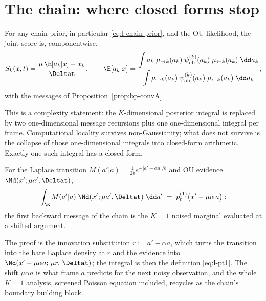 \section{The chain: where closed forms stop}\label{sec:l-chain}

\begin{theorem}\label{thm:l-markov-score}
For any chain prior, in particular \eqref{eq:l-chain-prior}, and the OU
likelihood, the joint score is, componentwise,
\begin{equation}
  S_k(x, t) = \frac{\mu\, \E[a_k | x] - x_k}{\Deltat},
  \qquad
  \E[a_k | x]
  = \frac{\displaystyle\int a_k\; \mu_{\to k}(a_k)\;
      \psi^{(k)}_{\mathrm{ob}}(a_k)\;
      \mu_{\leftarrow k}(a_k)\;\dd a_k}
     {\displaystyle\int \mu_{\to k}(a_k)\;
      \psi^{(k)}_{\mathrm{ob}}(a_k)\;
      \mu_{\leftarrow k}(a_k)\;\dd a_k},
  \label{eq:l-markov-score}
\end{equation}
with the messages of Proposition~\ref{prop:bp-convA}.
\end{theorem}

This is a complexity statement: the $K$-dimensional posterior integral is
replaced by two one-dimensional message recursions plus one
one-dimensional integral per frame. Computational locality survives
non-Gaussianity; what does not survive is the collapse of those
one-dimensional integrals into closed-form arithmetic. Exactly one such
integral has a closed form.

\begin{proposition}\label{prop:l-onestep}
For the Laplace transition $M(a'|a) = \frac{1}{2b} e^{-|a' - \alpha a|/b}$
and OU evidence $\Nd(x'; \mu a', \Deltat)$,
\begin{equation}
  \int_\R M(a' | a)\; \Nd(x'; \mu a', \Deltat)\; \dd a'
  \;=\; p_t^{(1)}\big( x' - \mu\alpha\, a \big) :
  \label{eq:l-onestep}
\end{equation}
the first backward message of the chain is the $K = 1$ noised marginal
evaluated at a shifted argument.
\end{proposition}

The proof is the innovation substitution $r := a' - \alpha a$, which
turns the transition into the bare Laplace density at $r$ and the
evidence into $\Nd(x' - \mu\alpha a;\, \mu r,\, \Deltat)$; the integral
is then the definition \eqref{eq:l-pt1}. The shift $\mu\alpha a$ is what
frame $a$ predicts for the next noisy observation, and the whole $K = 1$
analysis, screened Poisson equation included, recycles as the chain's
boundary building block.

